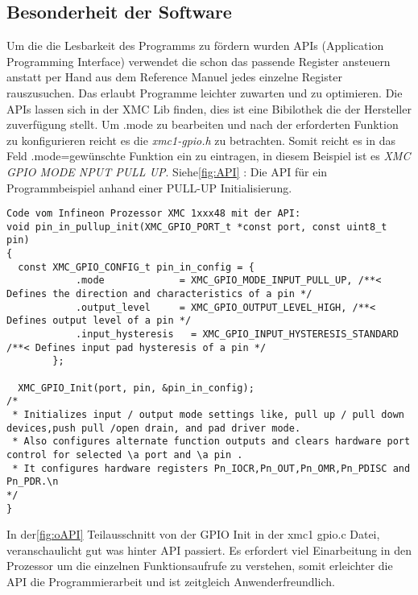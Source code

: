 \subsection{Besonderheit der Software}
Um die die Lesbarkeit des Programms zu fördern wurden APIs (Application Programming Interface) verwendet die schon das passende Register ansteuern anstatt per Hand aus dem Reference Manuel jedes einzelne Register rauszusuchen. Das erlaubt Programme leichter zuwarten und zu optimieren. Die APIs lassen sich in der XMC Lib finden, dies ist eine Bibilothek die der Hersteller zuverfügung stellt.
Um .mode zu bearbeiten und nach der erforderten Funktion zu konfigurieren reicht es die  \textit {xmc1-gpio.h} zu betrachten. Somit reicht es in das Feld .mode=gewünschte Funktion ein zu eintragen, in diesem Beispiel ist es \textit{XMC GPIO MODE NPUT PULL UP}.
Siehe\ref{fig:API} : Die API für ein Programmbeispiel anhand einer PULL-UP Initialisierung.
\\
\begin{minipage}{1\textwidth}
\begin{lstlisting}
Code vom Infineon Prozessor XMC 1xxx48 mit der API:
void pin_in_pullup_init(XMC_GPIO_PORT_t *const port, const uint8_t pin)
{
  const	XMC_GPIO_CONFIG_t pin_in_config = {
  			.mode             = XMC_GPIO_MODE_INPUT_PULL_UP, /**< Defines the direction and characteristics of a pin */
  			.output_level     = XMC_GPIO_OUTPUT_LEVEL_HIGH, /**< Defines output level of a pin */
  			.input_hysteresis	= XMC_GPIO_INPUT_HYSTERESIS_STANDARD /**< Defines input pad hysteresis of a pin */
  		};

  XMC_GPIO_Init(port, pin, &pin_in_config);
/*
 * Initializes input / output mode settings like, pull up / pull down devices,push pull /open drain, and pad driver mode.
 * Also configures alternate function outputs and clears hardware port control for selected \a port and \a pin .
 * It configures hardware registers Pn_IOCR,Pn_OUT,Pn_OMR,Pn_PDISC and Pn_PDR.\n
*/
}
\end{lstlisting}
\label{fig:API}
\end{minipage}

 In der\ref{fig:oAPI} Teilausschnitt von der GPIO Init in der xmc1 gpio.c Datei, veranschaulicht gut was hinter API passiert. Es erfordert viel Einarbeitung in den Prozessor um die einzelnen Funktionsaufrufe zu verstehen, somit erleichter die API die Programmierarbeit und ist zeitgleich Anwenderfreundlich.


